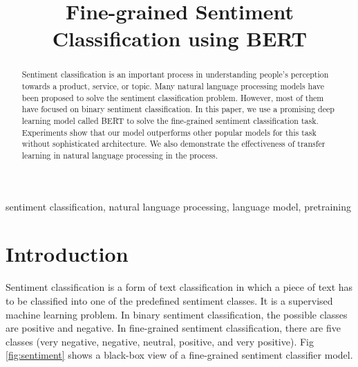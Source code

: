 \documentclass[conference]{IEEEtran}
\begin{document}
\title{Fine-grained Sentiment Classification using BERT}

\makeatletter
\newcommand{\linebreakand}{
  \end{@IEEEauthorhalign}
  \hfill\mbox{}\par
  \mbox{}\hfill\begin{@IEEEauthorhalign}
}
\makeatother
\author{
}

\maketitle

\begin{abstract}
Sentiment classification is an important process in understanding people's perception towards a product, service, or topic. Many natural language processing models have been proposed to solve the sentiment classification problem. However, most of them have focused on binary sentiment classification. In this paper, we use a promising deep learning model called BERT to solve the fine-grained sentiment classification task. Experiments show that our model outperforms other popular models for this task without sophisticated architecture. We also demonstrate the effectiveness of transfer learning in natural language processing in the process.
\end{abstract}

\begin{IEEEkeywords}
sentiment classification, natural language processing, language model, pretraining
\end{IEEEkeywords} \section{Introduction}

Sentiment classification is a form of text classification in which a piece of text has to be classified into one of the predefined sentiment classes. It is a supervised machine learning problem. In binary sentiment classification, the possible classes are positive and negative. In fine-grained sentiment classification, there are five classes (very negative, negative, neutral, positive, and very positive). Fig \ref{fig:sentiment} shows a black-box view of a fine-grained sentiment classifier model.
\end{document}

